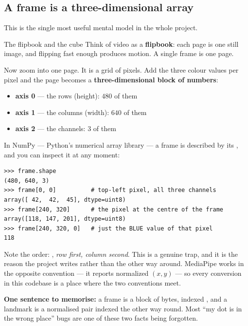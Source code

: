 \subsection{A frame is a three-dimensional array}

This is the single most useful mental model in the whole project.

\begin{mlconcept}{The flipbook and the cube}
Think of video as a \textbf{flipbook}: each page is one still image, and flipping fast enough
produces motion. A single frame is one page.

Now zoom into one page. It is a grid of pixels. Add the three colour values per pixel and the page
becomes a \textbf{three-dimensional block of numbers}:

\begin{itemize}
  \item \textbf{axis 0} --- the rows (height): $480$ of them
  \item \textbf{axis 1} --- the columns (width): $640$ of them
  \item \textbf{axis 2} --- the channels: $3$ of them
\end{itemize}

In NumPy --- Python's numerical array library --- a frame is described by its , and you
can inspect it at any moment:

\begin{lstlisting}
>>> frame.shape
(480, 640, 3)
>>> frame[0, 0]          # top-left pixel, all three channels
array([ 42,  42,  45], dtype=uint8)
>>> frame[240, 320]      # the pixel at the centre of the frame
array([118, 147, 201], dtype=uint8)
>>> frame[240, 320, 0]   # just the BLUE value of that pixel
118
\end{lstlisting}

Note the order: , \emph{row first, column second}. This is a genuine trap, and it
is the reason the project writes  rather than the other way
around. MediaPipe works in the opposite convention --- it reports normalized $(x, y)$ --- so every
conversion in this codebase is a place where the two conventions meet.
\end{mlconcept}

\begin{keyidea}
\textbf{One sentence to memorise:} a frame is a  block of bytes, indexed
, and a landmark is a normalised  pair indexed the other
way round. Most ``my dot is in the wrong place'' bugs are one of these two facts being forgotten.
\end{keyidea}

